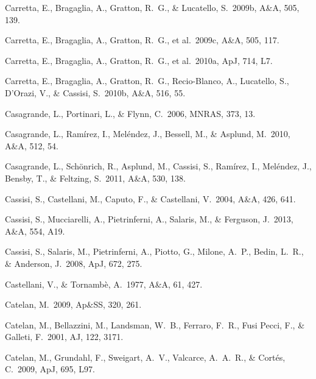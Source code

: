 \documentclass[12pt,preprint]{aastex}
\begin{document}
\begin{thebibliography}{}
Carretta, E., Bragaglia, A., Gratton, R.~G., \& Lucatello, S.~2009b, A\&A, 505,
 139.

Carretta, E., Bragaglia, A., Gratton, R.~G., et al.~2009c, A\&A, 505, 117.

Carretta, E., Bragaglia, A., Gratton, R.~G., et al.~2010a, ApJ, 714, L7.

Carretta, E., Bragaglia, A., Gratton, R.~G., Recio-Blanco, A., Lucatello, S.,
 D'Orazi, V., \& Cassisi, S.~2010b, A\&A, 516, 55.

Casagrande, L., Portinari, L., \& Flynn, C.~2006, MNRAS, 373, 13.

Casagrande, L., Ram\'irez, I., Mel\'endez, J., Bessell, M., \& Asplund,
 M.~2010, A\&A, 512, 54.

Casagrande, L., Sch\"onrich, R., Asplund, M., Cassisi, S., Ram\'irez, I.,
 Mel\'endez, J., Bensby, T., \& Feltzing, S.~2011, A\&A, 530, 138.


Cassisi, S., Castellani, M., Caputo, F., \& Castellani, V.~2004, A\&A, 426,
 641.

Cassisi, S., Mucciarelli, A., Pietrinferni, A., Salaris, M., \& Ferguson, 
 J.~2013, A\&A, 554, A19.


Cassisi, S., Salaris, M., Pietrinferni, A., Piotto, G., Milone, A.~P., Bedin,
 L.~R., \& Anderson, J.~2008, ApJ, 672, 275.

Castellani, V., \& Tornamb\`e, A.~1977, A\&A, 61, 427.

Catelan, M.~2009, Ap\&SS, 320, 261.

Catelan, M., Bellazzini, M., Landsman, W.~B., Ferraro, F.~R., Fusi Pecci, F.,
 \& Galleti, F.~2001, AJ, 122, 3171.

Catelan, M., Grundahl, F., Sweigart, A.~V., Valcarce, A.~A.~R., \& Cort\'es,
 C.~2009, ApJ, 695, L97.


\end{thebibliography}
\end{document}
